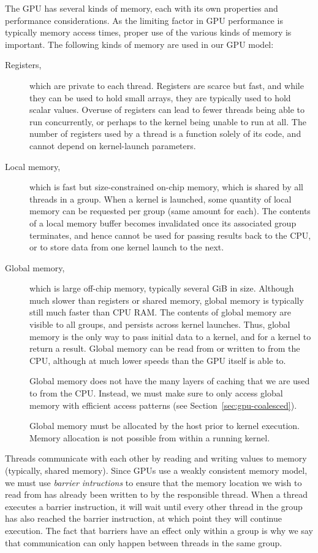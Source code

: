 The GPU has several kinds of memory, each with its own properties and
performance considerations.  As the limiting factor in GPU performance
is typically memory access times, proper use of the various kinds of
memory is important.  The following kinds of memory are used in our
GPU model:

\begin{description}
\item[Registers,] which are private to each thread.  Registers are
  scarce but fast, and while they can be used to hold small arrays,
  they are typically used to hold scalar values.  Overuse of registers
  can lead to fewer threads being able to run concurrently, or perhaps
  to the kernel being unable to run at all.  The number of registers
  used by a thread is a function solely of its code, and cannot depend
  on kernel-launch parameters.

\item[Local memory,] which is fast but size-constrained on-chip
  memory, which is shared by all threads in a group.  When a kernel is
  launched, some quantity of local memory can be requested per group
  (same amount for each).  The contents of a local memory buffer
  becomes invalidated once its associated group terminates, and hence
  cannot be used for passing results back to the CPU, or to store data
  from one kernel launch to the next.

\item[Global memory,] which is large off-chip memory, typically
  several GiB in size.  Although much slower than registers or shared
  memory, global memory is typically still much faster than CPU RAM.
  The contents of global memory are visible to all groups, and
  persists across kernel launches.  Thus, global memory is the only
  way to pass initial data to a kernel, and for a kernel to return a
  result.  Global memory can be read from or written to from the CPU,
  although at much lower speeds than the GPU itself is able to.

  Global memory does not have the many layers of caching that we are
  used to from the CPU.  Instead, we must make sure to only access
  global memory with efficient access patterns (see
  Section~\ref{sec:gpu-coalesced}).

  Global memory must be allocated by the host prior to kernel
  execution.  Memory allocation is not possible from within a running
  kernel.
\end{description}

Threads communicate with each other by reading and writing values to
memory (typically, shared memory).  Since GPUs use a weakly consistent
memory model, we must use \textit{barrier intructions} to ensure that
the memory location we wish to read from has already been written to
by the responsible thread.  When a thread executes a barrier
instruction, it will wait until every other thread in the group has
also reached the barrier instruction, at which point they will
continue execution.  The fact that barriers have an effect only within
a group is why we say that communication can only happen between
threads in the same group.

